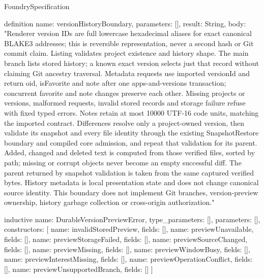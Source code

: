 \begin{lexlean}{FoundrySpecification}
\begin{semanticmodule}
definition{
  name: versionHistoryBoundary,
  parameters: [],
  result: String,
  body: "Renderer version IDs are full lowercase hexadecimal aliases for exact canonical BLAKE3 addresses; this is reversible representation, never a second hash or Git commit claim. Listing validates project existence and history shape. The main branch lists stored history; a known exact version selects just that record without claiming Git ancestry traversal. Metadata requests use imported versionId and return oid, isFavorite and note after one apps-and-versions transaction; concurrent favorite and note changes preserve each other. Missing projects or versions, malformed requests, invalid stored records and storage failure refuse with fixed typed errors. Notes retain at most 10000 UTF-16 code units, matching the imported contract. Differences resolve only a project-owned version, then validate its snapshot and every file identity through the existing SnapshotRestore boundary and compiled core admission, and repeat that validation for its parent. Added, changed and deleted text is computed from those verified files, sorted by path; missing or corrupt objects never become an empty successful diff. The parent returned by snapshot validation is taken from the same captured verified bytes. History metadata is local presentation state and does not change canonical source identity. This boundary does not implement Git branches, version-preview ownership, history garbage collection or cross-origin authorization."
}

inductive{
  name: DurableVersionPreviewError,
  type_parameters: [],
  parameters: [],
  constructors: [
    {name: invalidStoredPreview, fields: []},
    {name: previewUnavailable, fields: []},
    {name: previewStorageFailed, fields: []},
    {name: previewSourceChanged, fields: []},
    {name: previewMissing, fields: []},
    {name: previewWindowBusy, fields: []},
    {name: previewInterestMissing, fields: []},
    {name: previewOperationConflict, fields: []},
    {name: previewUnsupportedBranch, fields: []}
  ]
}


\end{semanticmodule}
\end{lexlean}

